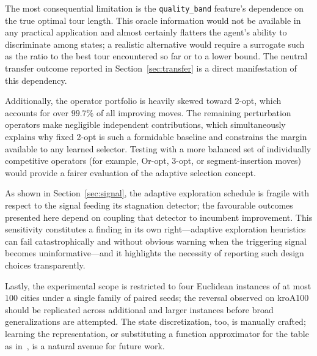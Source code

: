 \documentclass[10pt,twocolumn]{article}
\begin{document}
The most consequential limitation is the \texttt{quality\_band} feature's
dependence on the true optimal tour length. This oracle information would not
be available in any practical application and almost certainly flatters the
agent's ability to discriminate among states; a realistic alternative would
require a surrogate such as the ratio to the best tour encountered so far or to
a lower bound. The neutral transfer outcome reported in
Section~\ref{sec:transfer} is a direct manifestation of this dependency.

Additionally, the operator portfolio is heavily skewed toward 2-opt, which
accounts for over $99.7\%$ of all improving moves. The remaining perturbation
operators make negligible independent contributions, which simultaneously
explains why fixed 2-opt is such a formidable baseline and constrains the margin
available to any learned selector. Testing with a more balanced set of
individually competitive operators (for example, Or-opt, 3-opt, or
segment-insertion moves) would provide a fairer evaluation of the adaptive
selection concept.

As shown in Section~\ref{sec:signal}, the adaptive exploration schedule is
fragile with respect to the signal feeding its stagnation detector; the
favourable outcomes presented here depend on coupling that detector to incumbent
improvement. This sensitivity constitutes a finding in its own right---adaptive
exploration heuristics can fail catastrophically and without obvious warning
when the triggering signal becomes uninformative---and it highlights the
necessity of reporting such design choices transparently.

Lastly, the experimental scope is restricted to four Euclidean instances of at
most $100$ cities under a single family of paired seeds; the reversal observed
on kroA100 should be replicated across additional and larger instances before
broad generalizations are attempted. The state discretization, too, is manually
crafted; learning the representation, or substituting a function approximator
for the table as in~\cite{dacosta2020}, is a natural avenue for future work.

\end{document}
